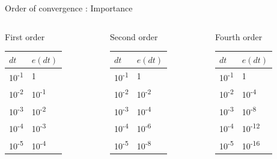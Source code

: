 \documentclass[presentation]{beamer}
\begin{document}
\begin{frame}[label={sec:org5d34663}]{Order of convergence : Importance}
\begin{columns}
\begin{column}{0.4\columnwidth}
\begin{block}{First order}
\begin{center}
\begin{tabular}{ll}
\toprule
\(dt\) & \(e(dt)\)\\
\midrule
10\textsuperscript{-1} & 1\\
10\textsuperscript{-2} & 10\textsuperscript{-1}\\
10\textsuperscript{-3} & 10\textsuperscript{-2}\\
10\textsuperscript{-4} & 10\textsuperscript{-3}\\
10\textsuperscript{-5} & 10\textsuperscript{-4}\\
\bottomrule
\end{tabular}
\end{center}
\end{block}
\end{column}
\begin{column}{0.4\columnwidth}
\begin{block}{Second order}
\begin{center}
\begin{tabular}{ll}
\toprule
\(dt\) & \(e(dt)\)\\
\midrule
10\textsuperscript{-1} & 1\\
10\textsuperscript{-2} & 10\textsuperscript{-2}\\
10\textsuperscript{-3} & 10\textsuperscript{-4}\\
10\textsuperscript{-4} & 10\textsuperscript{-6}\\
10\textsuperscript{-5} & 10\textsuperscript{-8}\\
\bottomrule
\end{tabular}
\end{center}
\end{block}
\end{column}
\begin{column}{0.4\columnwidth}
\begin{block}{Fourth order}
\begin{center}
\begin{tabular}{ll}
\toprule
\(dt\) & \(e(dt)\)\\
\midrule
10\textsuperscript{-1} & 1\\
10\textsuperscript{-2} & 10\textsuperscript{-4}\\
10\textsuperscript{-3} & 10\textsuperscript{-8}\\
10\textsuperscript{-4} & 10\textsuperscript{-12}\\
10\textsuperscript{-5} & 10\textsuperscript{-16}\\
\bottomrule
\end{tabular}
\end{center}
\end{block}
\end{column}
\end{columns}
\end{frame}
\end{document}
